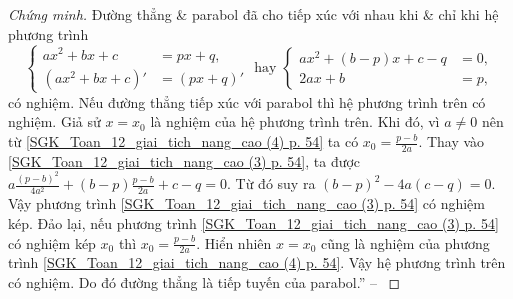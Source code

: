 \documentclass{article}
\numberwithin{equation}{section}
\begin{document}
\begin{proof}[Chứng minh]
	Đường thẳng \& parabol đã cho tiếp xúc với nhau khi \& chỉ khi hệ phương trình
	\begin{equation}
		\label{SGK_Toan_12_giai_tich_nang_cao (4) p. 54}
		\left\{\begin{split}
			ax^2 + bx + c &= px + q,\\
			(ax^2 + bx + c)' &= (px + q)'
		\end{split}\right.\mbox{ hay }\left\{\begin{split}
			ax^2 + (b - p)x + c - q &= 0,\\
			2ax + b & = p,
		\end{split}\right.
	\end{equation}
	có nghiệm. Nếu đường thẳng tiếp xúc với parabol thì hệ phương trình trên có nghiệm. Giả sử $x = x_0$ là nghiệm của hệ phương trình trên. Khi đó, vì $a\ne 0$ nên từ \eqref{SGK_Toan_12_giai_tich_nang_cao (4) p. 54} ta có $x_0 = \frac{p - b}{2a}$. Thay vào \eqref{SGK_Toan_12_giai_tich_nang_cao (3) p. 54}, ta được $a\frac{(p - b)^2}{4a^2} + (b - p)\frac{p - b}{2a} + c - q = 0$. Từ đó suy ra $(b - p)^2 - 4a(c - q) = 0$. Vậy phương trình \eqref{SGK_Toan_12_giai_tich_nang_cao (3) p. 54} có nghiệm kép. Đảo lại, nếu phương trình \eqref{SGK_Toan_12_giai_tich_nang_cao (3) p. 54} có nghiệm kép $x_0$ thì $x_0 = \frac{p - b}{2a}$. Hiển nhiên $x = x_0$ cũng là nghiệm của phương trình \eqref{SGK_Toan_12_giai_tich_nang_cao (4) p. 54}. Vậy hệ phương trình trên có nghiệm. Do đó đường thẳng là tiếp tuyến của parabol.'' -- \cite[pp. 53--54]{SGK_Toan_12_giai_tich_nang_cao}
\end{proof}
\end{document}
